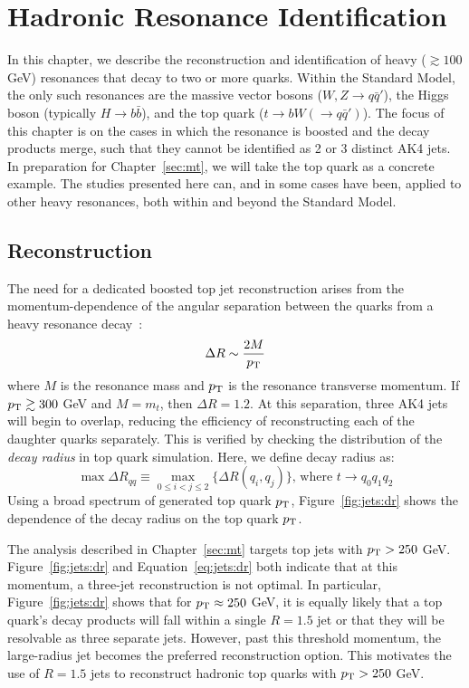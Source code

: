 \chapter{Hadronic Resonance Identification}
\label{sec:jets}

In this chapter, we describe the reconstruction and identification of heavy ($\gtrsim 100$ GeV) resonances that decay to two or more quarks.
Within the Standard Model, the only such resonances are the massive vector bosons ($W,Z\rightarrow q\bar{q}'$), the Higgs boson (typically $H\rightarrow b\bar{b}$), and the top quark ($t\rightarrow bW(\rightarrow q\bar{q}')$).
The focus of this chapter is on the cases in which the resonance is boosted and the decay products merge, such that they cannot be identified as 2 or 3 distinct AK4 jets.
In preparation for Chapter~\ref{sec:mt}, we will take the top quark as a concrete example.
The studies presented here can, and in some cases have been, applied to other heavy resonances, both within and beyond the Standard Model.

\section{Reconstruction}
\label{sec:jets:reco}

The need for a dedicated boosted top jet reconstruction arises from the momentum-dependence of the angular separation between the quarks from a heavy resonance decay~\cite{tasijets}:
\begin{equation}
    \Delta R \sim \frac{2M}{p_\mathrm{T}}
    \label{eq:jets:dr}
\end{equation}
where $M$ is the resonance mass and $p_\mathrm{T}$ is the resonance transverse momentum.
If $p_\mathrm{T}\gtrsim300$ GeV and $M = m_t$, then $\Delta R = 1.2$.
At this separation, three AK4 jets will begin to overlap, reducing the efficiency of reconstructing each of the daughter quarks separately.
This is verified by checking the distribution of the \emph{decay radius} in top quark simulation.
Here, we define decay radius as: 
\begin{equation}
    \max\Delta R_{qq} \equiv \displaystyle\max_{0\leq i < j \leq 2} \{\Delta R(q_i,q_j)\} \text{, where } t\rightarrow q_0q_1q_2
\end{equation}
Using a broad spectrum of generated top quark $p_\mathrm{T}$, Figure~\ref{fig:jets:dr} shows the dependence of the decay radius on the top quark $p_\mathrm{T}$.

The analysis described in Chapter~\ref{sec:mt} targets top jets with $p_\mathrm{T}>250$ GeV.
Figure~\ref{fig:jets:dr} and Equation~\ref{eq:jets:dr} both indicate that at this momentum, a three-jet reconstruction is not optimal.
In particular, Figure~\ref{fig:jets:dr} shows that for $p_\mathrm{T}\approx 250$ GeV, it is equally likely that a top quark's decay products will fall within a single $R=1.5$ jet or that they will be resolvable as three separate jets. 
However, past this threshold momentum, the large-radius jet becomes the preferred reconstruction option.
This motivates the use of $R=1.5$ jets to reconstruct hadronic top quarks with $p_\mathrm{T}>250$ GeV. 

